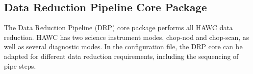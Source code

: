 \subsection{Data Reduction Pipeline Core Package}

The Data Reduction Pipeline (DRP) core package performs all HAWC data
reduction. HAWC has two science instrument modes, chop-nod and
chop-scan, as well as several diagnostic modes. In the configuration
file, the DRP core can be adapted for different data reduction
requirements, including the sequencing of pipe steps.

\begin{figure}[!ht]
\begin{minipage}{\textwidth}
\leavevmode \centering
{}
\hfil
\hfil
{}
\hfil
{}

\end{minipage}
\end{figure}
